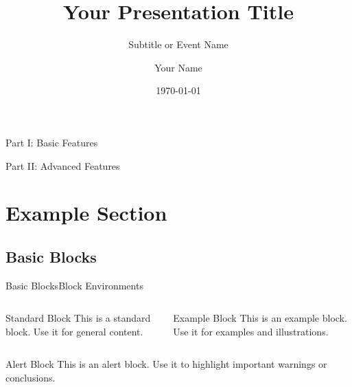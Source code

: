 \documentclass[
11pt,hyperref={pdfauthor=whatever}
]{beamer}
\title[
]{Your Presentation Title}
\subtitle{Subtitle or Event Name}
\author[
]{
    Your Name
}
\institute{
    Your Institution, \\
    Your Department}
\date{\today}
\begin{document}
{
\begin{frame}
  \titlepage
\end{frame}
}
\addtocounter{framenumber}{-1}

\begin{frame}{Part I: Basic Features}
    \tableofcontents[part=1]
\end{frame}

\begin{frame}{Part II: Advanced Features}
    \tableofcontents[part=2]
\end{frame}


\section{Example Section}

\subsection{Basic Blocks}
\begin{frame}{Basic Blocks}{Block Environments}
\begin{columns}[T,onlytextwidth]
    \begin{block}{Standard Block}
        This is a standard block. Use it for general content.
    \end{block}

    \begin{exampleblock}{Example Block}
        This is an example block. Use it for examples and illustrations.
    \end{exampleblock}
\end{columns}

\vspace{0.5cm}

\begin{alertblock}{Alert Block}
    This is an alert block. Use it to highlight important warnings or conclusions.
\end{alertblock}
\end{frame}
\end{document}
